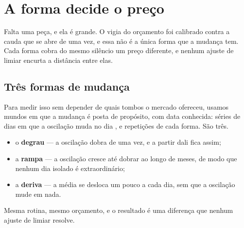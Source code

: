 %
%

\chapter{A forma decide o preço}\label{cap:formas}

Falta uma peça, e ela é grande. O vigia do orçamento foi calibrado contra a cauda que se abre de
uma vez, e essa não é a única forma que a mudança tem. Cada forma cobra do mesmo silêncio um preço
diferente, e nenhum ajuste de limiar encurta a distância entre elas.

\section{Três formas de mudança}

Para medir isso sem depender de quais tombos o mercado ofereceu, usamos mundos em que a
mudança é posta de propósito, com data conhecida: séries de \numFormaMundoDias{} dias em que a
oscilação muda no dia \numFormaMudancaDia, e \numFormaRepeticoes{} repetições de cada forma.
São três.

\begin{itemize}[leftmargin=1.5em]
  \item o \textbf{degrau} --- a oscilação dobra de uma vez, e a partir dali fica assim;
  \item a \textbf{rampa} --- a oscilação cresce até dobrar ao longo de meses, de modo que
    nenhum dia isolado é extraordinário;
  \item a \textbf{deriva} --- a média se desloca um pouco a cada dia, sem que a oscilação mude
    em nada.
\end{itemize}

Mesma rotina, mesmo orçamento, e o resultado é uma diferença que nenhum ajuste de limiar
resolve.

